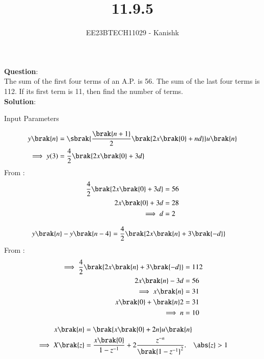 \documentclass[journal,12pt,twocolumn]{IEEEtran}
\theoremstyle{remark}
\begin{document}

\vspace{3cm}

\title{11.9.5}
\author{EE23BTECH11029 - Kanishk}
\maketitle

\bigskip


\textbf{Question}:\\ 
The sum of the first four terms of an A.P. is 56. The sum of the last four terms is
112. If its first term is 11, then find the number of terms.\\

\textbf{Solution}:\\ 

\begin{table}[ht]
    \centering
    \def\arraystretch{1.5}
    
   \caption{Input Parameters}
   \label{tab:11.9.5.12}
\end{table}

\small
\begin{align}
y\brak{n}&=\sbrak{\frac{\brak{n+1}}{2}\brak{2x\brak{0}+nd}}u\brak{n}\\
\implies y(3)&=\frac{4}{2}\brak{2x\brak{0}+3d}\\
\end{align}
From :
\begin{align}
\frac{4}{2}\brak{2x\brak{0}+3d}&=56\\
2x\brak{0}+3d&=28\\
\implies d&=2
\end{align}

\begin{align}
 y\brak{n}-y\brak{n-4}&=\frac{4}{2}\brak{2x\brak{n}+3\brak{-d}}
\end{align}
From :
\begin{align}
\implies \frac{4}{2}\brak{2x\brak{n}+3\brak{-d}}&=112\\
2x\brak{n}-3d&=56\\
\implies x\brak{n}&=31\\
x\brak{0}+\brak{n}2&=31\\
\implies n&=10
\end{align}


\begin{align}
x\brak{n}&=\brak{x\brak{0}+2n}u\brak{n}\\
\implies X\brak{z}&=\frac{x\brak{0}}{1-z^{-1}}+2\frac{z^{-n}}{\brak{1-z^{-1}}^{2}}.\quad \abs{z} > 1
\end{align}
\end{document}
